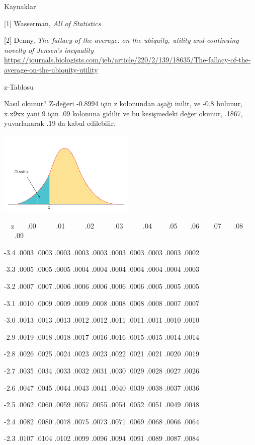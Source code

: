 \documentclass[12pt,fleqn]{article}\usepackage{../../common}
\begin{document}
Kaynaklar

[1] Wasserman, {\em All of Statistics}

[2] Denny, {\em The fallacy of the average: on the ubiquity, utility and continuing novelty of Jensen's inequality}
    \url{https://journals.biologists.com/jeb/article/220/2/139/18635/The-fallacy-of-the-average-on-the-ubiquity-utility}

\newpage

z-Tablosu

Nasıl okunur? Z-değeri -0.8994 için z kolonundan aşağı inilir, ve -0.8
bulunur, x.x9xx yani 9 için .09 kolonuna gidilir ve bu kesişmedeki değer
okunur, .1867, yuvarlanarak .19 da kabul edilebilir. 

\includegraphics[height=4cm]{stat_appendix_02.png}

\ \ z \ \ \  .00  \ \ \ \ \ .01 \ \ \ \ \ .02 \ \ \ \ \ .03 \ \ \ \ \ .04 \
\ \ \ .05 \ \ \ .06 \
\ \ .07 \ \ \ .08 \ \ \ .09

-3.4 .0003 .0003 .0003 .0003 .0003 .0003 .0003 .0003 .0003 .0002

-3.3 .0005 .0005 .0005 .0004 .0004 .0004 .0004 .0004 .0004 .0003

-3.2 .0007 .0007 .0006 .0006 .0006 .0006 .0006 .0005 .0005 .0005

-3.1 .0010 .0009 .0009 .0009 .0008 .0008 .0008 .0008 .0007 .0007

-3.0 .0013 .0013 .0013 .0012 .0012 .0011 .0011 .0011 .0010 .0010

-2.9 .0019 .0018 .0018 .0017 .0016 .0016 .0015 .0015 .0014 .0014

-2.8 .0026 .0025 .0024 .0023 .0023 .0022 .0021 .0021 .0020 .0019

-2.7 .0035 .0034 .0033 .0032 .0031 .0030 .0029 .0028 .0027 .0026

-2.6 .0047 .0045 .0044 .0043 .0041 .0040 .0039 .0038 .0037 .0036

-2.5 .0062 .0060 .0059 .0057 .0055 .0054 .0052 .0051 .0049 .0048

-2.4 .0082 .0080 .0078 .0075 .0073 .0071 .0069 .0068 .0066 .0064

-2.3 .0107 .0104 .0102 .0099 .0096 .0094 .0091 .0089 .0087 .0084
\end{document}

